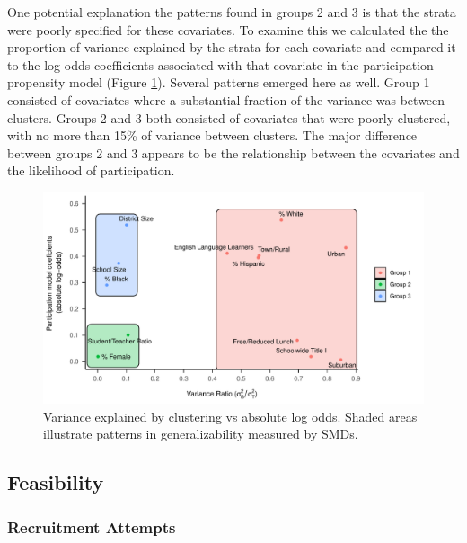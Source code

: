 \documentclass[
  english,
  man,floatsintext]{apa6}
\begin{document}
One potential explanation the patterns found in groups 2 and 3 is that the strata were poorly specified for these covariates. To examine this we calculated the the proportion of variance explained by the strata for each covariate and compared it to the log-odds coefficients associated with that covariate in the participation propensity model (Figure \ref{fig:fig-Var-Coef}). Several patterns emerged here as well. Group 1 consisted of covariates where a substantial fraction of the variance was between clusters. Groups 2 and 3 both consisted of covariates that were poorly clustered, with no more than 15\% of variance between clusters. The major difference between groups 2 and 3 appears to be the relationship between the covariates and the likelihood of participation.



\begin{figure}
\centering
\includegraphics{6---Paper_files/figure-latex/fig-Var-Coef-1.pdf}
\caption{\label{fig:fig-Var-Coef}Variance explained by clustering vs absolute log odds. Shaded areas illustrate patterns in generalizability measured by SMDs.}
\end{figure}

\hypertarget{feasibility-1}{%
\subsection{Feasibility}\label{feasibility-1}}

\hypertarget{recruitment-attempts}{%
\subsubsection{Recruitment Attempts}\label{recruitment-attempts}}
\end{document}
